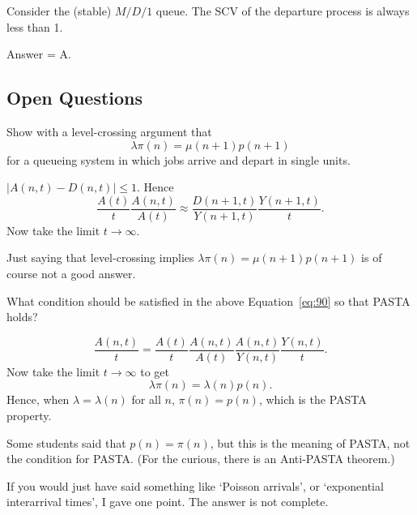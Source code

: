 \begin{exercise}[201907]
Consider the (stable) $M/D/1$ queue. The SCV of the departure process is always less than 1. 
\begin{solution}
Answer = A.
\end{solution}
\end{exercise}

 
\subsection{Open Questions}

\begin{exercise}[201704] 
Show with a level-crossing argument that
 \begin{equation}\label{eq:90}
 \lambda \pi(n) = \mu(n+1) p(n+1)
 \end{equation}
 for a queueing system in which jobs arrive and depart in single
 units.
\begin{solution}
 $|A(n,t)-D(n,t)| \leq 1$. Hence
 \begin{equation*}
 \frac{A(t)}{t} \frac{A(n,t)}{A(t)} \approx 
 \frac{D(n+1, t)}{Y(n+1,t)} \frac{Y(n+1,t)}{t}.
 \end{equation*}
Now take the limit $t\to \infty$.

Just saying that level-crossing implies $\lambda \pi(n) = \mu(n+1)p(n+1)$ is of course not a good answer. 
\end{solution}
\end{exercise}

\begin{exercise}[201704]
 What condition should be satisfied in the above Equation~\eqref{eq:90} so that PASTA holds? 
\begin{solution}
 \begin{equation*}
\frac{A(n,t)}t = \frac{A(t)}{t} \frac{A(n,t)}{A(t)} \frac{A(n, t)}{Y(n,t)} \frac{Y(n,t)}{t}.
 \end{equation*}
Now take the limit $t\to \infty$ to get
 \begin{equation*}
\lambda \pi(n) = \lambda(n)p(n).
 \end{equation*}
Hence, when $\lambda=\lambda(n)$ for all $n$, $\pi(n)=p(n)$, which is the PASTA property.


Some students said that $p(n)=\pi(n)$, but this is the meaning of PASTA, not the condition for PASTA. (For the curious, there is an Anti-PASTA theorem.) 

If you would just have said something like `Poisson arrivals', or `exponential interarrival times', I gave one point. The answer is not complete. 
\end{solution}
\end{exercise}


